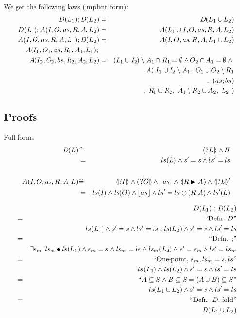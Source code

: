 We get the following laws (implicit form):
\begin{eqnarray*}
   D(L_1) ; D(L_2) &=& D(L_1 \cup L_2)
%
\\ D(L_1) ;  A(I,O,as,R,A,L_2)
   &=&
   A(L_1\cup I,O,as,R,A,L_2)
%
\\  A(I,O,as,R,A,L_1) ; D(L_2)
   &=&
   A(I,O,as,R,A,L_1\cup L_2)
%
\\ A(I_1,O_1,as,R_1,A_1,L_1) ; {}
\\ A(I_2,O_2,bs,R_2,A_2,L_2)
   &=&  (L_1 \cup I_2)\setminus A_1 \cap R_1 = \emptyset
        \land O_2 \cap A_1 = \emptyset \land {}
\\&& A(~   I_1 \cup I_2\setminus A_1
      ,~   O_1 \cup O_2\setminus R_1
\\&& ~~~,~ (as\!\seq\! bs)
\\&& ~~~,~ R_1 \cup R_2
      ,~   A_1\setminus R_2 \cup A_2
      ,~   L_2 ~)
\end{eqnarray*}

\subsection{Proofs}

Full forms
\begin{eqnarray*}
   D(L)
   &\defs& \LS{L} \land \Skip
\\ &  =  & ls(L) \land s'=s \land ls'=ls
\\
\\ A(I,O,as,R,A,L)
   &\defs&
   \LS{I} \land \LS{\B O} \land \ado{as} \land \LUPD{R}{A} \land \LSd{L}
\\ &  =  & ls(I) \land ls(\B O) \land \ado{as} \land \lupd R A \land ls'(L)
\end{eqnarray*}

\begin{eqnarray*}
  && D(L_1) \mathrel{;} D(L_2)
\\&=&\textrm{``Defn. $D$''}
\\&& ls(L_1) \land s'=s \land ls'=ls \mathrel{;} ls(L_2) \land s'=s \land ls'=ls
\\&=&\textrm{``Defn. $\mathrel{;}$''}
\\&& \exists s_m,ls_m \bullet
    ls(L_1) \land s_m=s \land ls_m=ls
    \land ls_m(L_2) \land s'=s_m \land ls'=ls_m
\\&=&\textrm{``One-point, $s_m,ls_m = s,ls$''}
\\&& ls(L_1) \land ls(L_2) \land s'=s \land ls'=ls
\\&=&\textrm{``$A \subseteq S \land B \subseteq S = (A \cup B) \subseteq S$''}
\\&& ls(L_1 \cup L_2) \land s'=s \land ls'=ls
\\&=&\textrm{``Defn. $D$, fold''}
\\&& D(L_1 \cup L_2)
\end{eqnarray*}

